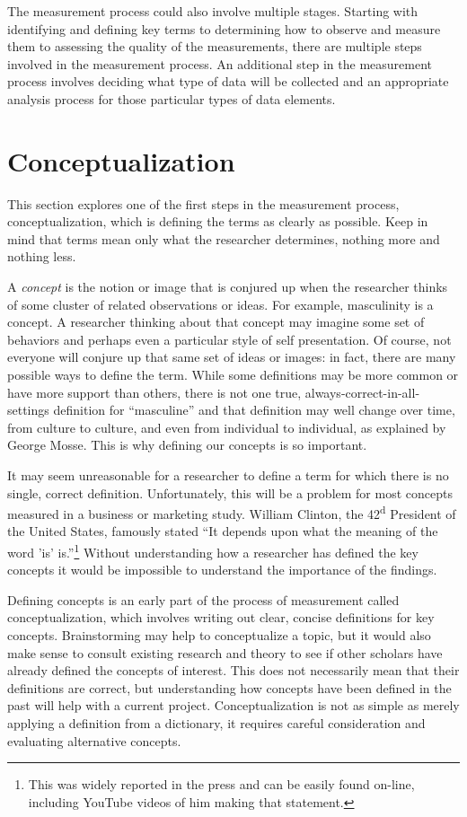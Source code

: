 The measurement process could also involve multiple stages. Starting with identifying and defining key terms to determining how to observe and measure them to assessing the quality of the measurements, there are multiple steps involved in the measurement process. An additional step in the measurement process involves deciding what type of data will be collected and an appropriate analysis process for those particular types of data elements. 

\section{Conceptualization}

This section explores one of the first steps in the measurement process, conceptualization, which is defining the terms as clearly as possible. Keep in mind that terms mean only what the researcher determines, nothing more and nothing less.

A \textit{concept} is the notion or image that is conjured up when the researcher thinks of some cluster of related observations or ideas. For example, masculinity is a concept. A researcher thinking about that concept may imagine some set of behaviors and perhaps even a particular style of self presentation. Of course, not everyone will conjure up that same set of ideas or images: in fact, there are many possible ways to define the term. While some definitions may be more common or have more support than others, there is not one true, always-correct-in-all-settings definition for ``masculine'' and that definition may well change over time, from culture to culture, and even from individual to individual, as explained by George Mosse\cite{george1996image}. This is why defining our concepts is so important.

It may seem unreasonable for a researcher to define a term for which there is no single, correct definition. Unfortunately, this will be a problem for most concepts measured in a business or marketing study. William Clinton, the 42\textsuperscript{d} President of the United States, famously stated ``It depends upon what the meaning of the word 'is' is.''\footnote{This was widely reported in the press and can be easily found on-line, including YouTube videos of him making that statement.} Without understanding how a researcher has defined the key concepts it would be impossible to understand the importance of the findings.

Defining concepts is an early part of the process of measurement called conceptualization, which involves writing out clear, concise definitions for key concepts. Brainstorming may help to conceptualize a topic, but it would also make sense to consult existing research and theory to see if other scholars have already defined the concepts of interest. This does not necessarily mean that their definitions are correct, but understanding how concepts have been defined in the past will help with a current project. Conceptualization is not as simple as merely applying a definition from a dictionary, it requires careful consideration and evaluating alternative concepts.

